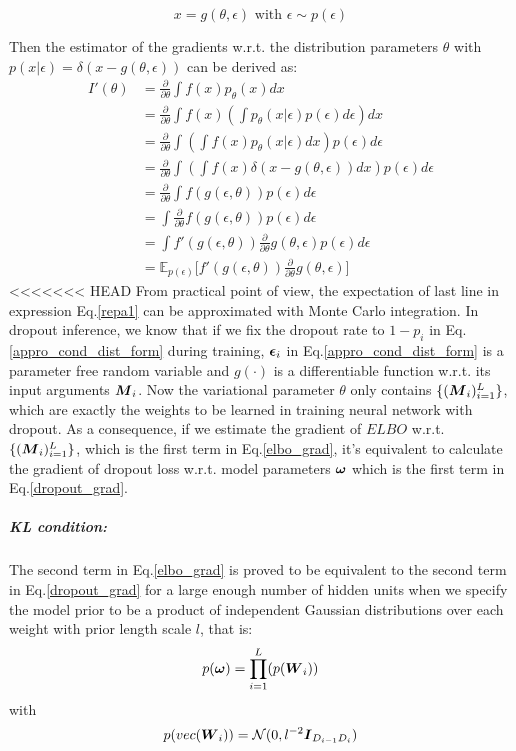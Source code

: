 \[
x = g(\theta, \epsilon)  \text{ with } \epsilon \sim p(\epsilon)
\]

Then the estimator of the gradients w.r.t. the distribution parameters $\theta$ with $p(x|\epsilon) = \delta(x-g(\theta,\epsilon))$ can be derived as:
\begin{equation}
\begin{aligned} \label{repa1}
I'(\theta) &= \frac{\partial}{\partial \theta} \int f(x) p_{\theta}(x) dx \\
&= \frac{\partial}{\partial \theta} \int f(x)(\int p_{\theta}(x|\epsilon)p(\epsilon)d\epsilon) dx \\
&= \frac{\partial}{\partial \theta} \int (\int f(x) p_{\theta}(x|\epsilon)dx) p(\epsilon) d\epsilon \\
&= \frac{\partial}{\partial \theta} \int (\int f(x)\delta(x-g(\theta,\epsilon))dx) p(\epsilon) d\epsilon \\ 
&= \frac{\partial}{\partial \theta} \int f(g(\epsilon, \theta)) p(\epsilon) d\epsilon \\
&= \int \frac{\partial}{\partial \theta} f(g(\epsilon, \theta)) p(\epsilon) d\epsilon \\
&= \int f'(g(\epsilon, \theta))\frac{\partial}{\partial \theta}g(\theta, \epsilon) p(\epsilon) d\epsilon \\
&= \mathbb E_{p(\epsilon)}\big[ f'(g(\epsilon, \theta))\frac{\partial}{\partial \theta}g(\theta, \epsilon)\big] 
\end{aligned}
\end{equation} 
<<<<<<< HEAD
From practical point of view, the expectation of last line in expression Eq.\ref{repa1} can be approximated with Monte Carlo integration. In dropout inference, we know that if we fix the dropout rate to $1- p_{i}$ in Eq.\ref{appro_cond_dist_form} during training, $\boldsymbol \epsilon_{i}$ in Eq.\ref{appro_cond_dist_form} is a parameter free random variable and $g(\cdot)$ is a differentiable function w.r.t. its input arguments $\boldsymbol M_{i}$. Now the variational parameter $\theta$ only contains $\{(\boldsymbol M_{i})_{i=1}^{L} \}$, which are exactly the weights to be learned in training neural network with dropout. As a consequence, if we estimate the gradient of $ELBO$ w.r.t. $\{(\boldsymbol M_{i})_{i=1}^{L}\}$, which is the first term in Eq.\ref{elbo_grad}, it's equivalent to calculate the gradient of dropout loss w.r.t. model parameters $\boldsymbol \omega$ which is the first term in Eq.\ref{dropout_grad}.

\subparagraph{KL condition:} The second term in Eq.\ref{elbo_grad} is proved to be equivalent to the second term in Eq.\ref{dropout_grad}
for a large enough number of hidden units when we specify the model prior to be a product of independent Gaussian distributions over each weight with prior length scale $l$, that is:
\[p(\boldsymbol \omega) = \prod_{i=1}^{L}(p(\boldsymbol W_{i})) \]
with
\[
p(vec(\boldsymbol W_{i})) = \mathcal N(0, l^{-2}\boldsymbol I_{D_{i-1} D_{i}})
\]

